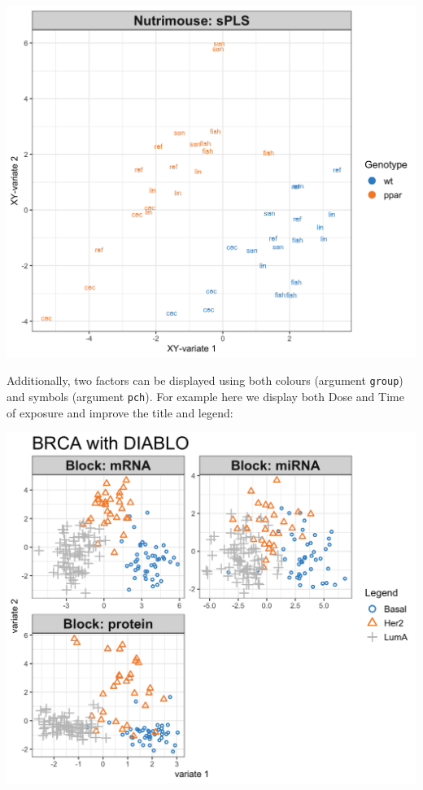 \documentclass[]{book}
\newenvironment{Shaded}{\begin{snugshade}}{\end{snugshade}}
\newcommand{\KeywordTok}[1]{\textcolor[rgb]{0.13,0.29,0.53}{\textbf{#1}}}
\newcommand{\DataTypeTok}[1]{\textcolor[rgb]{0.13,0.29,0.53}{#1}}
\newcommand{\StringTok}[1]{\textcolor[rgb]{0.31,0.60,0.02}{#1}}
\newcommand{\OtherTok}[1]{\textcolor[rgb]{0.56,0.35,0.01}{#1}}
\newcommand{\OperatorTok}[1]{\textcolor[rgb]{0.81,0.36,0.00}{\textbf{#1}}}
\newcommand{\NormalTok}[1]{#1}
\theoremstyle{definition}
\theoremstyle{definition}
\theoremstyle{definition}
\theoremstyle{remark}
\begin{document}
\begin{center}\includegraphics[width=0.5\linewidth]{Figures/unnamed-chunk-3-1} \end{center}

Additionally, two factors can be displayed using both colours (argument
\texttt{group}) and symbols (argument \texttt{pch}). For example here we
display both Dose and Time of exposure and improve the title and legend:

\begin{Shaded}
\end{Shaded}

\begin{center}\includegraphics[width=0.5\linewidth]{Figures/unnamed-chunk-4-1} \end{center}
\end{document}
